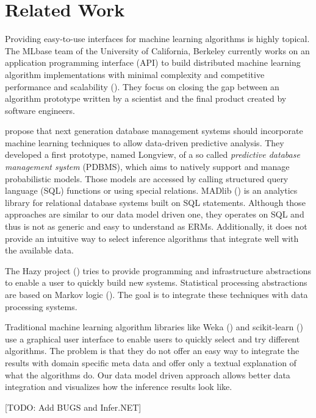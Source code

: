 \section{Related Work}

Providing easy-to-use interfaces for machine learning algorithms is highly topical. The MLbase team of the University of California, Berkeley currently works on an application programming interface (API) to build distributed machine learning algorithm implementations with minimal complexity and competitive performance and scalability (\cite{sparks2013mli}). They focus on closing the gap between an algorithm prototype written by a scientist and the final product created by software engineers.

\textcite{akdere2011case} propose that next generation database management systems should incorporate machine learning techniques to allow data-driven predictive analysis. They developed a first prototype, named Longview, of a so called \emph{predictive database management system} (PDBMS), which aims to natively support and manage probabilistic models. Those models are accessed by calling structured query language (SQL) functions or using special relations. MADlib (\cite{hellerstein2012madlib}) is an analytics library for relational database systems built on SQL statements. Although those approaches are similar to our data model driven one, they operates on SQL and thus is not as generic and easy to understand as ERMs. Additionally, it does not provide an intuitive way to select inference algorithms that integrate well with the available data.

The Hazy project (\cite{kumar2013hazy}) tries to provide programming and infrastructure abstractions to enable a user to quickly build new systems. Statistical processing abstractions are based on Markov logic (\cite{domingos2007markov}). The goal is to integrate these techniques with data processing systems.

Traditional machine learning algorithm libraries like Weka (\cite{hall2009weka}) and scikit-learn (\cite{scikit-learn}) use a graphical user interface to enable users to quickly select and try different algorithms. The problem is that they do not offer an easy way to integrate the results with domain specific meta data and offer only a textual explanation of what the algorithms do. Our data model driven approach allows better data integration and visualizes how the inference results look like.

[TODO: Add BUGS and Infer.NET]

